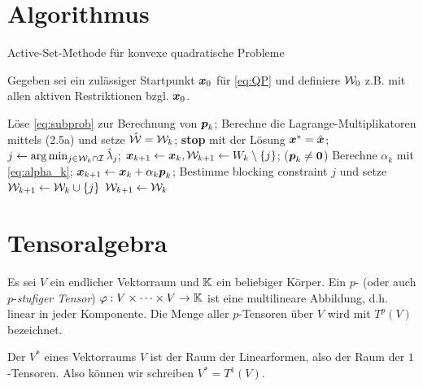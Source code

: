 \section{Algorithmus}
\label{anhang:B.3}

\begin{algorithm}[H]
\caption{Active-Set-Methode für konvexe quadratische Probleme}
Gegeben sei ein zulässiger Startpunkt $\boldsymbol x_0$ für \eqref{eq:QP} und definiere $\mathcal W_0$ z.B. mit allen aktiven Restriktionen bzgl. $\boldsymbol x_0$.
\begin{algorithmic}
\State Löse \eqref{eq:subprob} zur Berechnung von $\boldsymbol p_k$;
\State Berechne die Lagrange-Multiplikatoren mittels (2.5a)
\State \quad und setze $\hat{\mathcal W} = \mathcal W_k$;
\State \textbf{stop} mit der Lösung $\boldsymbol x^* = \hat{\boldsymbol x}$;
\Else
\State $j \leftarrow \arg\min_{j\in \mathcal W_k \cap \mathcal I} \hat\lambda_j;$
\State $\boldsymbol x_{k+1} \leftarrow \boldsymbol x_k, \mathcal W_{k+1} \leftarrow W_k \setminus \{j\}$;
\EndIf
\Else \quad ($\boldsymbol p_k \not= \boldsymbol 0$)
\State Berechne $\alpha_k$ mit \eqref{eq:alpha_k};
\State $\boldsymbol x_{k+1} \leftarrow  \boldsymbol x_k + \alpha_k\boldsymbol p_k$;
\State Bestimme  blocking constraint $j$ und setze $\mathcal W_{k+1} \leftarrow \mathcal W_k \cup \{j\}$
\Else
\State $\mathcal W_{k+1} \leftarrow \mathcal W_k$
\EndIf
\EndIf
\EndFor
\end{algorithmic}
\end{algorithm}







\label{anhang:C}


\section{Tensoralgebra}
\label{kap:C.1}


\begin{defi}\label{def:C.1}
Es sei $V$ ein endlicher Vektorraum und $\mathbb{K}$ ein beliebiger Körper. Ein $p$-\textit{} (oder auch $p$-\textit{stufiger Tensor}) $\varphi: V\times \dots \times V \rightarrow \mathbb{K}$ ist eine multilineare Abbildung, d.h. linear in jeder Komponente. Die Menge aller $p$-Tensoren über $V$ wird mit $T^p(V)$ bezeichnet.
\end{defi}

\begin{bsp}\label{bsp:C.2}
Der  $V^*$ eines Vektorraums $V$ ist der Raum der Linearformen, also der Raum der $1$-Tensoren. Also können wir schreiben $V^* = T^1(V)$.
\end{bsp}

